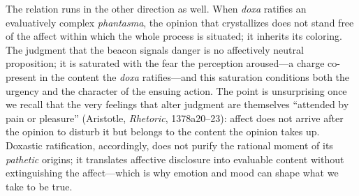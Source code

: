 The relation runs in the other direction as well. When \textit{doxa} ratifies an evaluatively complex \textit{phantasma}, the opinion that crystallizes does not stand free of the affect within which the whole process is situated; it inherits its coloring. The judgment that the beacon signals danger is no affectively neutral proposition; it is saturated with the fear the perception aroused---a charge co-present in the content the \textit{doxa} ratifies---and this saturation conditions both the urgency and the character of the ensuing action. The point is unsurprising once we recall that the very feelings that alter judgment are themselves ``attended by pain or pleasure'' (Aristotle, \textit{Rhetoric}, 1378a20--23): affect does not arrive after the opinion to disturb it but belongs to the content the opinion takes up. Doxastic ratification, accordingly, does not purify the rational moment of its \textit{pathetic} origins; it translates affective disclosure into evaluable content without extinguishing the affect---which is why emotion and mood can shape what we take to be true.

